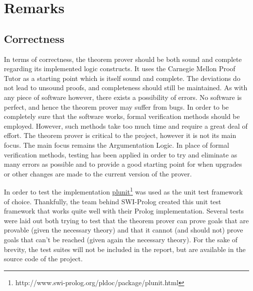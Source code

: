 \documentclass[11pt,twoside,a4paper]{report}
\begin{document}
\section{Remarks}
\label{sec:tpeval}

\subsection{Correctness}
In terms of correctness, the theorem prover should be both sound and complete regarding its implemented logic constructs. It uses the Carnegie Mellon Proof Tutor as a starting point which is itself sound and complete. The deviations do not lead to unsound proofs, and completeness should still be maintained. As with any piece of software however, there exists a possibility of errors. No software is perfect, and hence the theorem prover may suffer from bugs. In order to be completely sure that the software works, formal verification methods should be employed. However, such methods take too much time and require a great deal of effort. The theorem prover is critical to the project, however it is not its main focus. The main focus remains the Argumentation Logic. In place of formal verification methods, testing has been applied in order to try and eliminate as many errors as possible and to provide a good starting point for when upgrades or other changes are made to the current version of the prover.

In order to test the implementation \href{http://www.swi-prolog.org/pldoc/package/plunit.html}{plunit}\footnote{http://www.swi-prolog.org/pldoc/package/plunit.html} was used as the unit test framework of choice. Thankfully, the team behind SWI-Prolog created this unit test framework that works quite well with their Prolog implementation. Several tests were laid out both trying to test that the theorem prover can prove goals that are provable (given the necessary theory) and that it cannot (and should not) prove goals that can't be reached (given again the necessary theory). For the sake of brevity, the test suites will not be included in the report, but are available in the source code of the project.
\end{document}
